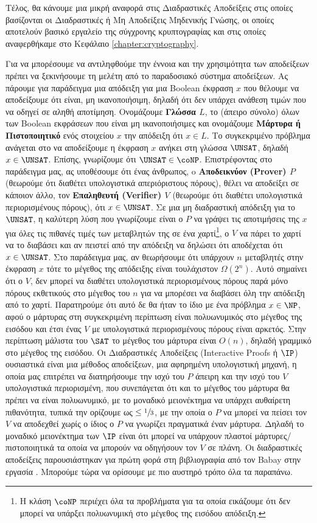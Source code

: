 Τέλος, θα κάνουμε μια μικρή αναφορά στις Διαδραστικές Αποδείξεις στις οποίες βασίζονται οι Διαδραστικές ή Μη Αποδείξεις Μηδενικής Γνώσης, οι οποίες αποτελούν βασικό εργαλείο της σύγχρονης κρυπτογραφίας και στις οποίες αναφερθήκαμε στο Κεφάλαιο \ref{chapter:cryptography}.

Για να μπορέσουμε να αντιληφθούμε την έννοια και την χρησιμότητα των αποδείξεων πρέπει να ξεκινήσουμε τη μελέτη από το παραδοσιακό σύστημα αποδείξεων.  Ας πάρουμε για παράδειγμα μια απόδειξη για μια Boolean έκφραση $x$ που θέλουμε να αποδείξουμε ότι είναι, μη ικανοποιήσιμη, δηλαδή ότι δεν υπάρχει ανάθεση τιμών που να οδηγεί σε αληθή αποτίμηση. Ονομάζουμε \textbf{Γλώσσα $L$}, το (άπειρο σύνολο) όλων των Boolean εκφράσεων που είναι μη ικανοποιήσιμες και ονομάζουμε \textbf{Μάρτυρα ή Πιστοποιητικό} ενός στοιχείου $x$ την απόδειξη ότι $x \in L$. Το συγκεκριμένο πρόβλημα ανάγεται στο να αποδείξουμε η έκφραση $x$ ανήκει στη γλώσσα $\UNSAT$, δηλαδή $x \in \UNSAT$.
Επίσης, γνωρίζουμε ότι $\UNSAT \in \coNP$. Επιστρέφοντας στο παράδειγμα μας, ας υποθέσουμε ότι ένας άνθρωπος, o \textbf{Αποδεικνύον (Prover) $P$} (θεωρούμε ότι διαθέτει υπολογιστικά απεριόριστους πόρους), θέλει να αποδείξει σε κάποιον άλλο, τον \textbf{Επαληθευτή (Verifier) $V$} (θεωρούμε ότι διαθέτει υπολογιστικά περιορισμένους πόρους), ότι $x \in \UNSAT$. Σε μια μη διαδραστική απόδειξη για το $\UNSAT$, η καλύτερη λύση που γνωρίζουμε είναι ο $P$ να γράψει τις αποτιμήσεις της $x$ για όλες τις πιθανές τιμές των μεταβλητών της σε ένα χαρτί\footnote{Η κλάση $\coNP$ περιέχει όλα τα προβλήματα για τα οποία εικάζουμε ότι δεν μπορεί να υπάρξει πολυωνυμική στο μέγεθος της εισόδου απόδειξη.}, ο $V$ να πάρει το χαρτί να το διαβάσει και αν πειστεί από την απόδειξη να δηλώσει ότι αποδέχεται ότι $x \in \UNSAT$. Στο παράδειγμα μας, αν θεωρήσουμε ότι υπάρχουν $n$ μεταβλητές στην έκφραση $x$ τότε το μέγεθος της απόδειξης είναι τουλάχιστον $Ω(2^n)$. Αυτό σημαίνει ότι ο $V$, δεν μπορεί να διαθέτει υπολογιστικά περιορισμένους πόρους παρά μόνο πόρους εκθετικούς στο μέγεθος του $n$ για να μπορέσει να διαβάσει όλη την απόδειξη από το χαρτί. Παρατηρούμε ότι αυτό δε θα ήταν το ίδιο με ένα πρόβλημα $x \in \NP$, αφού ο μάρτυρας στη συγκεκριμένη περίπτωση είναι πολυωνυμικός στο μέγεθος της εισόδου και έτσι ένας $V$ με υπολογιστικά περιορισμένους πόρους είναι αρκετός. Στην περίπτωση μάλιστα του $\SAT$ το μέγεθος του μάρτυρα είναι $O(n)$, δηλαδή γραμμικό στο μέγεθος της εισόδου. Οι Διαδραστικές Αποδείξεις (Interactive Proofs ή $\IP$) ουσιαστικά είναι μια μέθοδος αποδείξεων, μια αφηρημένη υπολογιστική μηχανή, η οποία μας επιτρέπει να διατηρήσουμε την ισχύ του $P$ άπειρη και την ισχύ του $V$ υπολογιστικά περιορισμένη, που συνεπάγεται ότι και το μέγεθος του μάρτυρα θα πρέπει να είναι πολυωνυμικό, με το μοναδικό μειονέκτημα να υπάρχει αυθαίρετη πιθανότητα, τυπικά την ορίζουμε ως $\le \sfrac{1}{3}$, με την οποία ο $P$ να μπορεί να πείσει τον $V$ να αποδεχθεί χωρίς ο ίδιος ο $P$ να γνωρίζει πραγματικά έναν μάρτυρα. Δηλαδή το μοναδικό μειονέκτημα των $\IP$ είναι ότι μπορεί να υπάρχουν πλαστοί μάρτυρες/πιστοποιητικά τα οποία να μπορούν να οδηγήσουν τον $V$ σε πλάνη. Οι διαδραστικές αποδείξεις παρουσιάστηκαν για πρώτη φορά στη βιβλιογραφία από τον Babay στην εργασία \cite{10.1145/22145.22192}. Μπορούμε τώρα να ορίσουμε με πιο αυστηρό τρόπο όλα τα παραπάνω.

